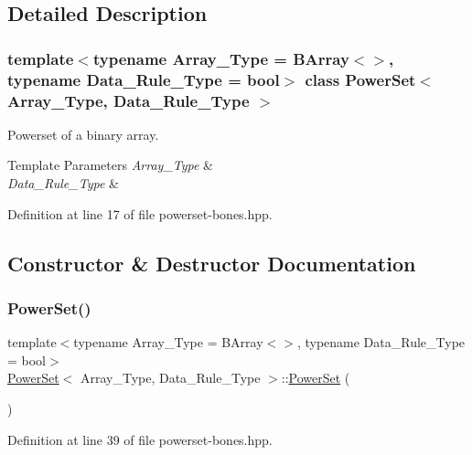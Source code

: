 \subsection{Detailed Description}
\subsubsection*{template$<$typename Array\+\_\+\+Type = B\+Array$<$$>$, typename Data\+\_\+\+Rule\+\_\+\+Type = bool$>$\newline
class Power\+Set$<$ Array\+\_\+\+Type, Data\+\_\+\+Rule\+\_\+\+Type $>$}

Powerset of a binary array. 


\begin{DoxyTemplParams}{Template Parameters}
{\em Array\+\_\+\+Type} & \\
\hline
{\em Data\+\_\+\+Rule\+\_\+\+Type} & \\
\hline
\end{DoxyTemplParams}


Definition at line 17 of file powerset-\/bones.\+hpp.



\subsection{Constructor \& Destructor Documentation}
\mbox{\label{class_power_set_a095815ccc44c88e0da73d92c6b5cf5f3}} 
\subsubsection{\texorpdfstring{Power\+Set()}{PowerSet()}\hspace{0.1cm}{\footnotesize\ttfamily [1/3]}}
{\footnotesize\ttfamily template$<$typename Array\+\_\+\+Type  = B\+Array$<$$>$, typename Data\+\_\+\+Rule\+\_\+\+Type  = bool$>$ \\
\hyperlink{class_power_set}{Power\+Set}$<$ Array\+\_\+\+Type, Data\+\_\+\+Rule\+\_\+\+Type $>$\+::\hyperlink{class_power_set}{Power\+Set} (\begin{DoxyParamCaption}{ }\end{DoxyParamCaption})\hspace{0.3cm}{\ttfamily [inline]}}



Definition at line 39 of file powerset-\/bones.\+hpp.

